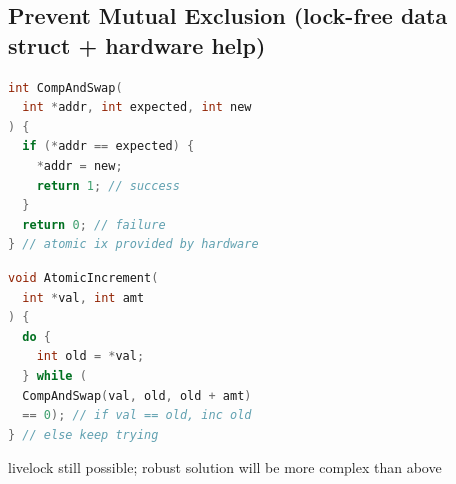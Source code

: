 \documentclass[8pt,a4paper,landscape]{extarticle}
\begin{document}
\begin{multicols*}{3}
\section*{Prevent Mutual Exclusion (lock-free data struct + hardware help)}
\begin{minipage}{0.5\linewidth}
\begin{lstlisting}[language=c]
int CompAndSwap(
  int *addr, int expected, int new
) {
  if (*addr == expected) {
    *addr = new;
    return 1; // success
  }
  return 0; // failure
} // atomic ix provided by hardware
\end{lstlisting}
\end{minipage}
\begin{minipage}{0.5\linewidth}
\begin{lstlisting}[language=c,xleftmargin=2pt]
void AtomicIncrement(
  int *val, int amt
) {
  do {
    int old = *val;
  } while (
  CompAndSwap(val, old, old + amt)
  == 0); // if val == old, inc old
} // else keep trying
\end{lstlisting}
\end{minipage}
livelock still possible; robust solution will be more complex than above\newline
\begin{minipage}{0.55\linewidth}

\end{minipage}
\end{multicols*}
\end{document}
